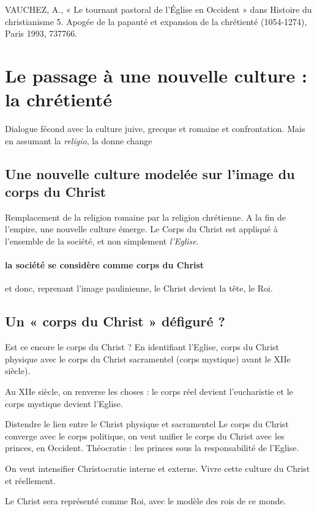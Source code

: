 VAUCHEZ, A., « Le tournant pastoral de l’Église en Occident » dans Histoire du christianisme 5. Apogée de la papauté et expansion de la chrétienté (1054-1274), Paris 1993, 737766.



\section{Le passage à une nouvelle culture : la chrétienté }

Dialogue fécond avec la culture juive, grecque et romaine et confrontation. Mais en assumant la \textit{religio}, la donne change

\subsection{Une nouvelle culture modelée sur l’image du corps du Christ}

Remplacement de la religion romaine par la religion chrétienne. A la fin de l'empire, une nouvelle culture émerge. Le Corps du Christ est appliqué à l'ensemble de la société, et non simplement \textit{l'Eglise}. 

\paragraph{la société se considère comme corps du Christ} et donc, reprenant l'image paulinienne, le Christ devient la tête, le Roi. 


\subsection{Un « corps du Christ » défiguré ? }
Est ce encore le corps du Christ ? 
En identifiant l'Eglise, corps du Christ physique avec le corps du Christ sacramentel (corps mystique) avant le XIIe siècle).

Au XIIe siècle, on renverse les choses : le corps réel devient l'eucharistie et le corps mystique devient l'Eglise. 

Distendre le lien entre le Christ physique et sacramentel 
Le corps du Christ converge avec le corps politique, on veut unifier le corps du Christ avec les princes, en Occident. Théocratie : les princes sous la responsabilité de l'Eglise. 

On veut intensifier Christocratie interne et externe. Vivre cette culture du Christ et réellement.

Le Christ sera représenté comme Roi, avec le modèle des rois de ce monde. 


